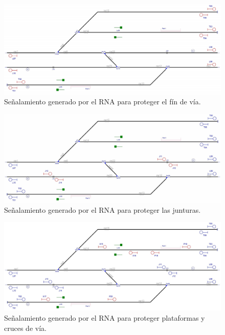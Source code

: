     \begin{figure}[h]
        \centering
        \includegraphics[width=1\textwidth]{resultados-obtenidos/ejemplo1/images/1_step1.png}
        \centering\caption{Señalamiento generado por el RNA para proteger el fín de vía.}
    \end{figure}

    \begin{figure}[h]
        \centering
        \includegraphics[width=1\textwidth]{resultados-obtenidos/ejemplo1/images/1_step2.png}
        \centering\caption{Señalamiento generado por el RNA para proteger las junturas.}
    \end{figure}

    \begin{figure}[h]
        \centering
        \includegraphics[width=1\textwidth]{resultados-obtenidos/ejemplo1/images/1_step3.png}
        \centering\caption{Señalamiento generado por el RNA para proteger plataformas y cruces de vía.}
    \end{figure}

